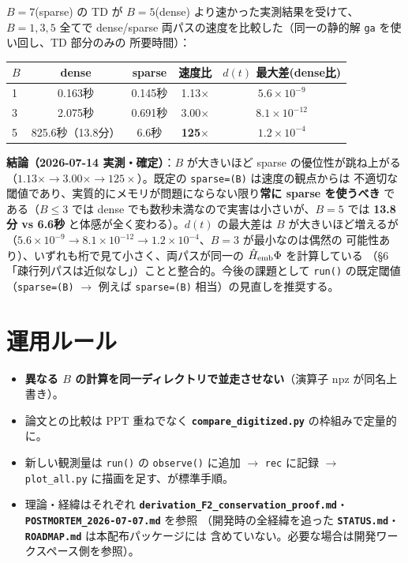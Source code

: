 \documentclass[11pt]{ltjsarticle}
\newcommand{\code}[1]{\texttt{#1}}
\newcommand{\file}[1]{\textbf{\texttt{#1}}}
\begin{document}
$B=7$(sparse) の TD が $B=5$(dense) より速かった実測結果を受けて、$B=1,3,5$ 全てで
dense/sparse 両パスの速度を比較した（同一の静的解 \code{ga} を使い回し、TD 部分のみの
所要時間）：

\begin{center}
\begin{tabular}{lcccc}
\toprule
$B$ & dense & sparse & 速度比 & $d(t)$ 最大差(dense比) \\
\midrule
1 & 0.163秒 & 0.145秒 & 1.13$\times$ & $5.6\times10^{-9}$ \\
3 & 2.075秒 & 0.691秒 & 3.00$\times$ & $8.1\times10^{-12}$ \\
5 & 825.6秒（13.8分） & 6.6秒 & \textbf{125$\times$} & $1.2\times10^{-4}$ \\
\bottomrule
\end{tabular}
\end{center}

\textbf{結論（2026-07-14 実測・確定）}：$B$ が大きいほど sparse の優位性が跳ね上がる
（$1.13\times\to3.00\times\to125\times$）。既定の \code{sparse=(B)} は速度の観点からは
不適切な閾値であり、実質的にメモリが問題にならない限り\textbf{常に sparse を使うべき}
である（$B\le3$ では dense でも数秒未満なので実害は小さいが、$B=5$ では
\textbf{13.8分 vs 6.6秒} と体感が全く変わる）。$d(t)$ の最大差は $B$ が大きいほど増えるが
（$5.6\times10^{-9}\to8.1\times10^{-12}\to1.2\times10^{-4}$、$B=3$ が最小なのは偶然の
可能性あり）、いずれも桁で見て小さく、両パスが同一の $\hat H_{\rm emb}\Phi$ を計算している
（\S6「疎行列パスは近似なし」）ことと整合的。今後の課題として \code{run()} の既定閾値
（\code{sparse=(B)} $\to$ 例えば \code{sparse=(B)} 相当）の見直しを推奨する。

\section{運用ルール}

\begin{itemize}
\item \textbf{異なる $B$ の計算を同一ディレクトリで並走させない}（演算子 npz が同名上書き）。
\item 論文との比較は PPT 重ねでなく \file{compare\_digitized.py} の枠組みで定量的に。
\item 新しい観測量は \code{run()} の \code{observe()} に追加 $\to$ \code{rec} に記録
$\to$ \code{plot\_all.py} に描画を足す、が標準手順。
\item 理論・経緯はそれぞれ
\file{derivation\_F2\_conservation\_proof.md}・\file{POSTMORTEM\_2026-07-07.md} を参照
（開発時の全経緯を追った \file{STATUS.md}・\file{ROADMAP.md} は本配布パッケージには
含めていない。必要な場合は開発ワークスペース側を参照）。
\end{itemize}
\end{document}

